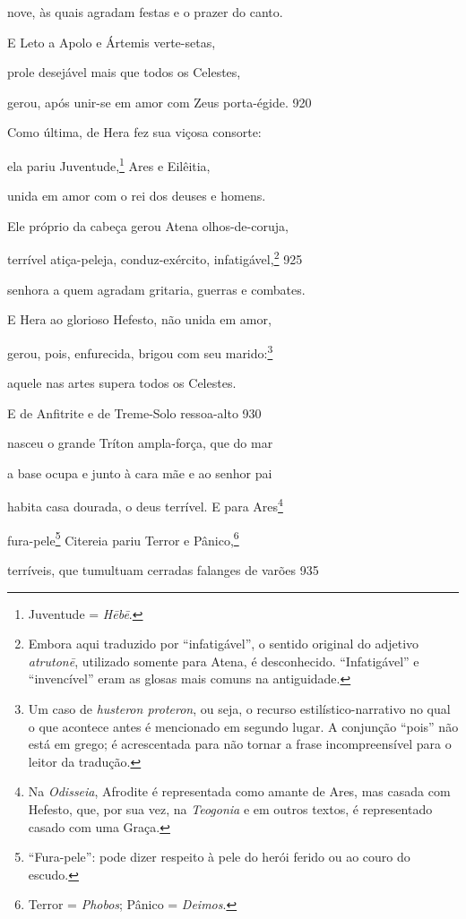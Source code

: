 nove, às quais agradam festas e o prazer do canto.

\quad{}E Leto a Apolo e Ártemis verte-setas,

prole desejável mais que todos os Celestes,

gerou, após unir-se em amor com Zeus porta-égide. \num{920}

\quad{}Como última, de Hera fez sua viçosa consorte:

ela pariu Juventude,\footnote{Juventude = \emph{Hēbē}.} Ares e Eilêitia,

unida em amor com o rei dos deuses e homens.

\quad{}Ele próprio da cabeça gerou Atena olhos-de-coruja,

terrível atiça-peleja, conduz-exército, infatigável,\footnote{Embora aqui traduzido por ``infatigável'', o sentido original do
adjetivo \emph{atrutonē}, utilizado somente para Atena, é desconhecido.
``Infatigável'' e ``invencível'' eram as glosas mais comuns na
antiguidade.} \num{925}

senhora a quem agradam gritaria, guerras e combates.

E Hera ao glorioso Hefesto, não unida em amor,

gerou, pois, enfurecida, brigou com seu marido:\footnote{Um caso de \emph{husteron proteron}, ou seja, o recurso
estilístico-narrativo no qual o que acontece antes é mencionado em
segundo lugar. A conjunção ``pois'' não está em grego; é acrescentada
para não tornar a frase incompreensível para o leitor da tradução.}

aquele nas artes supera todos os Celestes.

\quad{}E de Anfitrite e de Treme-Solo ressoa-alto \num{930}

nasceu o grande Tríton ampla-força, que do mar

a base ocupa e junto à cara mãe e ao senhor pai

habita casa dourada, o deus terrível. E para Ares\footnote{Na \emph{Odisseia}, Afrodite é representada como amante de Ares, mas casada com Hefesto, que, por sua vez, na \emph{Teogonia} e em outros textos, é representado casado com uma Graça.}

fura-pele\footnote{``Fura-pele'': pode dizer respeito à pele do herói ferido ou ao
couro do escudo.} Citereia pariu Terror e Pânico,\footnote{Terror = \emph{Phobos}; Pânico = \emph{Deimos}.}

terríveis, que tumultuam cerradas falanges de varões \num{935}

